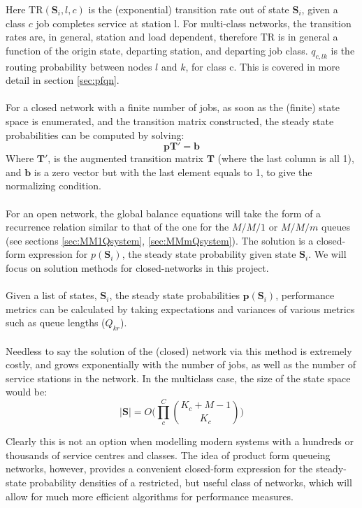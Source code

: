 Here \(\text{TR}(\mathbf{S}_i, l, c)\) is the (exponential) transition rate out of state \(\mathbf{S}_i\), given a class \(c\) job completes service at station l. For multi-class networks, the transition rates are, in general, station and load dependent, therefore \(\text{TR}\) is in general a function of the origin state, departing station, and departing job class. \(q_{c,lk}\) is the routing probability between nodes \(l\) and \(k\), for class c. This is covered in more detail in section \ref{sec:pfqn}.
\\\\
For a closed network with a finite number of jobs, as soon as the (finite) state space is enumerated, and the transition matrix constructed, the steady state probabilities can be computed by solving:
\begin{equation*}
    \mathbf{p}\mathbf{T'} = \mathbf{b}
\end{equation*}
Where \(\mathbf{T'}\), is the augmented transition matrix \(\mathbf{T}\) (where the last column is all 1), and \(\mathbf{b}\) is a zero vector but with the last element equals to 1, to give the normalizing condition.
\\\\
For an open network, the global balance equations will take the form of a recurrence relation similar to that of the one for the \(M/M/1\) or \(M/M/m\) queues (see sections \ref{sec:MM1Qsystem}, \ref{sec:MMmQsystem}). The solution is a closed-form expression for \(p(\mathbf{S}_i)\), the steady state probability given state \(\mathbf{S}_i\). We will focus on solution methods for closed-networks in this project.
\\\\
Given a list of states, \(\mathbf{S}_i\), the steady state probabilities \(\mathbf{p}(\mathbf{S}_i)\), performance metrics can be calculated by taking expectations and variances of various metrics such as queue lengths (\(Q_{kr}\)).
\\\\
Needless to say the solution of the (closed) network via this method is extremely costly, and grows exponentially with the number of jobs, as well as the number of service stations in the network. In the multiclass case, the size of the state space would be:
\[|\mathbf{S}| = O\bigg( \prod_c^C \binom{K_c + M -1}{K_c} \bigg)\]

Clearly this is not an option when modelling modern systems with a hundreds or thousands of service centres and classes. The idea of product form queueing networks, however, provides a convenient closed-form expression for the steady-state probability densities of a restricted, but useful class of networks, which will allow for much more efficient algorithms for performance measures.

